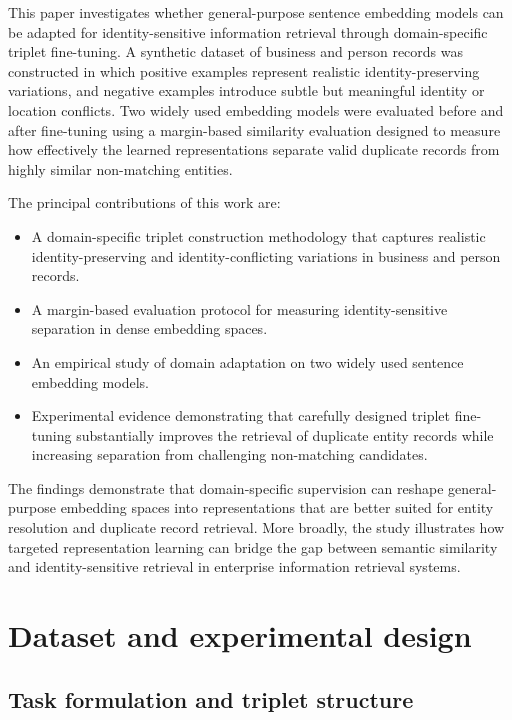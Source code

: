 \documentclass{article}
\begin{document}
This paper investigates whether general-purpose sentence embedding models can be adapted for identity-sensitive information retrieval through domain-specific triplet fine-tuning. A synthetic dataset of business and person records was constructed in which positive examples represent realistic identity-preserving variations, and negative examples introduce subtle but meaningful identity or location conflicts. Two widely used embedding models were evaluated before and after fine-tuning using a margin-based similarity evaluation designed to measure how effectively the learned representations separate valid duplicate records from highly similar non-matching entities.

The principal contributions of this work are:
\begin{itemize}
  \item A domain-specific triplet construction methodology that captures realistic identity-preserving and identity-conflicting variations in business and person records.
  \item A margin-based evaluation protocol for measuring identity-sensitive separation in dense embedding spaces.
  \item An empirical study of domain adaptation on two widely used sentence embedding models.
  \item Experimental evidence demonstrating that carefully designed triplet fine-tuning substantially improves the retrieval of duplicate entity records while increasing separation from challenging non-matching candidates.
\end{itemize}

The findings demonstrate that domain-specific supervision can reshape general-purpose embedding spaces into representations that are better suited for entity resolution and duplicate record retrieval. More broadly, the study illustrates how targeted representation learning can bridge the gap between semantic similarity and identity-sensitive retrieval in enterprise information retrieval systems.

\section{Dataset and experimental design}
\label{sec:dataset}

\subsection{Task formulation and triplet structure}
\end{document}
